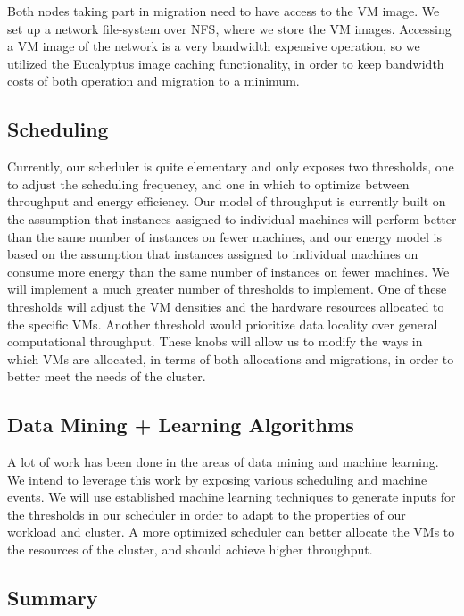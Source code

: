 Both nodes taking part in migration need to have access to the VM image.  We set up a network file-system over NFS, where we store the VM images.  Accessing a VM image of the network is a very bandwidth expensive operation, so we utilized the Eucalyptus image caching functionality, in order to keep bandwidth costs of both operation and migration to a minimum.

\subsection{Scheduling}

Currently, our scheduler is quite elementary and only exposes two thresholds, one to adjust the scheduling frequency, and one in which to optimize between throughput and energy efficiency.  Our model of throughput is currently built on the assumption that instances assigned to individual machines will perform better than the same number of instances on fewer machines, and our energy model is based on the assumption that instances assigned to individual machines on consume more energy than the same number of instances on fewer machines.  We will implement a much greater number of thresholds to implement.  One of these thresholds will adjust the VM densities and the hardware resources allocated to the specific VMs.  Another threshold would prioritize data locality over general computational throughput.  These knobs will allow us to modify the ways in which VMs are allocated, in terms of both allocations and migrations, in order to better meet the needs of the cluster.

\subsection{Data Mining + Learning Algorithms}

A lot of work has been done in the areas of data mining and machine learning.  We intend to leverage this work by exposing various scheduling and machine events.  We will use established machine learning techniques to generate inputs for the thresholds in our scheduler in order to adapt to the properties of our workload and cluster.  A more optimized scheduler can better allocate the VMs to the resources of the cluster, and should achieve higher throughput.

\subsection{Summary}

